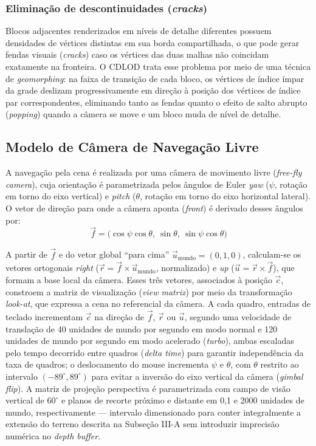 \documentclass[conference]{IEEEtran}
\begin{document}
\subsubsection{Eliminação de descontinuidades (\emph{cracks})}
Blocos
adjacentes renderizados em níveis de detalhe diferentes possuem
densidades de vértices distintas em sua borda compartilhada, o que pode
gerar fendas visuais (\emph{cracks}) caso os vértices das duas malhas não
coincidam exatamente na fronteira. O CDLOD trata esse problema por meio
de uma técnica de \emph{geomorphing}: na faixa de transição de cada
bloco, os vértices de índice ímpar da grade deslizam progressivamente em
direção à posição dos vértices de índice par correspondentes, eliminando
tanto as fendas quanto o efeito de salto abrupto (\emph{popping}) quando
a câmera se move e um bloco muda de nível de detalhe.

\subsection{Modelo de Câmera de Navegação Livre}

A navegação pela cena é realizada por uma câmera de movimento livre
(\emph{free-fly camera}), cuja orientação é parametrizada pelos ângulos
de Euler \emph{yaw} ($\psi$, rotação em torno do eixo vertical) e
\emph{pitch} ($\theta$, rotação em torno do eixo horizontal lateral). O
vetor de direção para onde a câmera aponta (\emph{front}) é derivado
desses ângulos por:
\begin{equation}
\vec{f} = \big(\cos\psi\cos\theta,\ \sin\theta,\ \sin\psi\cos\theta\big)
\label{eq:front}
\end{equation}

A partir de $\vec{f}$ e do vetor global ``para cima''
$\vec{u}_{\text{mundo}} = (0,1,0)$, calculam-se os vetores ortogonais
\emph{right} ($\vec{r} = \vec{f} \times \vec{u}_{\text{mundo}}$,
normalizado) e \emph{up} ($\vec{u} = \vec{r} \times \vec{f}$), que formam
a base local da câmera. Esses três vetores, associados à posição
$\vec{c}$, constroem a matriz de visualização (\emph{view matrix}) por
meio da transformação \emph{look-at}, que expressa a cena no referencial
da câmera. A cada quadro, entradas de teclado incrementam $\vec{c}$ na
direção de $\vec{f}$, $\vec{r}$ ou $\vec{u}$, segundo uma velocidade de
translação de 40 unidades de mundo por segundo em modo normal e 120
unidades de mundo por segundo em modo acelerado (\emph{turbo}), ambas
escaladas pelo tempo decorrido entre quadros (\emph{delta time}) para
garantir independência da taxa de quadros; o deslocamento do mouse
incrementa $\psi$ e $\theta$, com $\theta$ restrito ao intervalo
$(-89^{\circ}, 89^{\circ})$ para evitar a inversão do eixo vertical da
câmera (\emph{gimbal flip}). A matriz de projeção perspectiva é
parametrizada com campo de visão vertical de $60^{\circ}$ e planos de
recorte próximo e distante em 0,1 e 2000 unidades de mundo,
respectivamente --- intervalo dimensionado para conter integralmente a
extensão do terreno descrita na Subseção III-A sem introduzir imprecisão
numérica no \emph{depth buffer}.
\end{document}
